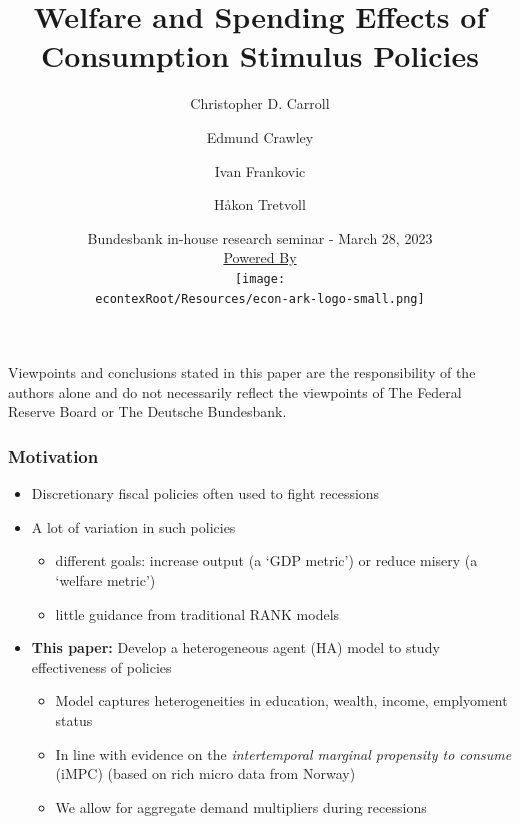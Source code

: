 \documentclass[pdflatex]{beamer}
\title[Stimulus]{Welfare and Spending Effects of Consumption Stimulus Policies}
\author{
  Christopher D. Carroll
  \and
  Edmund Crawley
  \and
  Ivan Frankovic
  \and
  H{\aa}kon Tretvoll
}
\date[\today]{Bundesbank in-house research seminar - March 28, 2023  \\ \medskip \medskip \medskip 
	\href{https://econ-ark.org/}{\small Powered By} \\ \texttt{[image: \\econtexRoot/Resources/econ-ark-logo-small.png]}}
\begin{document}


\begin{frame}[plain]
  \titlepage
  
  \footnotesize{Viewpoints and conclusions stated in this paper are the responsibility of the authors alone and do not necessarily reflect the viewpoints of The Federal Reserve Board or The Deutsche Bundesbank.}
\end{frame}




	
\begin{frame}
\frametitle{Motivation}
\begin{itemize} 
	\item Discretionary fiscal policies often used to fight recessions
	\item A lot of variation in such policies
	\begin{itemize}
		\itemsep = .25\bigskipamount 
		\item different goals: increase output (a `GDP metric') or reduce misery (a `welfare metric')
		\item little guidance from traditional RANK models
	\end{itemize}
	\item \textbf{This paper:} Develop a heterogeneous agent (HA) model to study effectiveness of policies
	\begin{itemize}
		\itemsep = .25\bigskipamount 
		\item Model captures heterogeneities in education, wealth, income, emplyoment status 
		\item In line with evidence on the \textit{intertemporal marginal propensity to consume} (iMPC)  (based on rich micro data from Norway)
		\item We allow for aggregate demand multipliers during recessions
	\end{itemize}
\end{itemize}
\end{frame}
\end{document}
